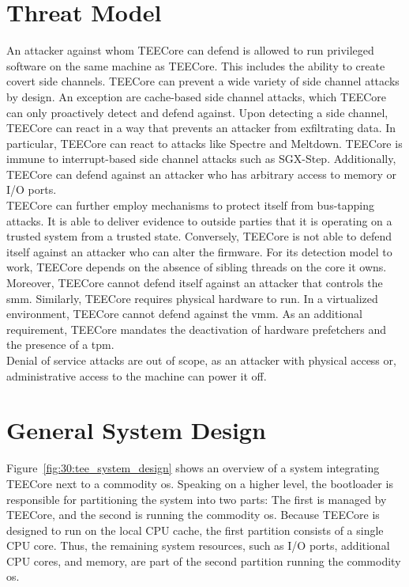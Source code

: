 \section{Threat Model}
\label{sec:30:tee_attacker_model}
An attacker against whom TEECore can defend is allowed to run privileged
software on the same machine as TEECore. This includes the ability to create
covert side channels. TEECore can prevent a wide variety of side channel attacks
by design. An exception are cache-based side channel attacks, which TEECore can
only proactively detect and defend against. Upon detecting a side channel,
TEECore can react in a way that prevents an attacker from exfiltrating data. In
particular, TEECore can react to attacks like Spectre and Meltdown. TEECore is
immune to interrupt-based side channel attacks such as SGX-Step. Additionally,
TEECore can defend against an attacker who has arbitrary access to memory or I/O
ports. \\

TEECore can further employ mechanisms to protect itself from bus-tapping
attacks. It is able to deliver evidence to outside parties that it is operating
on a trusted system from a trusted state. Conversely, TEECore is not able to
defend itself against an attacker who can alter the firmware. For its detection
model to work, TEECore depends on the absence of sibling threads on the core it
owns. Moreover, TEECore cannot defend itself against an attacker that controls
the \gls{smm}. Similarly, TEECore requires physical hardware to run. In a
virtualized environment, TEECore cannot defend against the \gls{vmm}. As an
additional requirement, TEECore mandates the deactivation of hardware
prefetchers and the presence of a \gls{tpm}.\\

Denial of service attacks are out of scope, as an attacker with physical access
or, administrative access to the machine can power it off.

\section{General System Design}
\label{sec:30:tee_general}
Figure~\ref{fig:30:tee_system_design} shows an overview of a system integrating
TEECore next to a commodity \gls{os}. Speaking on a higher level, the bootloader
is responsible for partitioning the system into two parts: The first is managed
by TEECore, and the second is running the commodity \gls{os}. Because TEECore is
designed to run on the local CPU cache, the first partition consists of a single
CPU core. Thus, the remaining system resources, such as I/O ports, additional
CPU cores, and memory, are part of the second partition running the commodity
\gls{os}.\\

